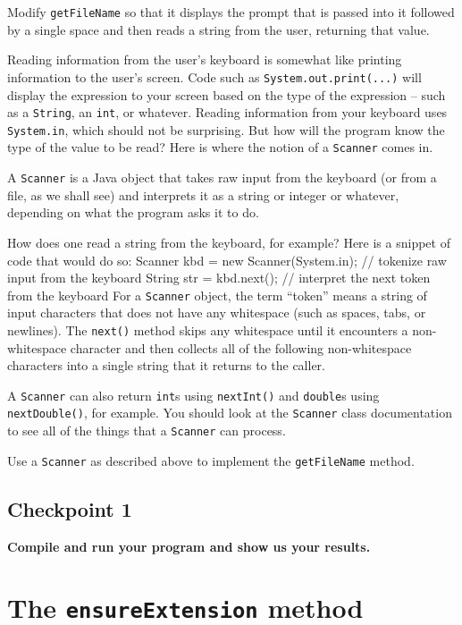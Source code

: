 \documentclass[12pt]{article}
\newenvironment{qv}%
  {\quote
   \verbatim}%
  {\endverbatim
   \endquote}
\newcommand{\code}{\texttt}
\begin{document}
Modify \code{getFileName} so that it displays the prompt
that is passed into it followed by a single space and then reads a
string from the user, returning that value.

Reading information from the user's keyboard
is somewhat like printing information to the user's screen.
Code such as \verb'System.out.print(...)' will display
the expression to your screen
based on the type of the expression --
such as a \verb'String', an \verb'int', or whatever.
Reading information from your keyboard uses \verb'System.in',
which should not be surprising.
But how will the program know the type of the value to be read?
Here is where the notion of a \verb'Scanner' comes in.

A \verb'Scanner' is a Java object that takes raw input
from the keyboard (or from a file, as we shall see)
and interprets it as a string or integer or whatever,
depending on what the program asks it to do.

How does one read a string from the keyboard, for example?
Here is a snippet of code that would do so:
\begin{qv}
Scanner kbd = new Scanner(System.in); // tokenize raw input from the keyboard
String str = kbd.next(); // interpret the next token from the keyboard
\end{qv}
For a \verb'Scanner' object, the term ``token'' means
a string of input characters that does not have any whitespace
(such as spaces, tabs, or newlines).
The \verb'next()' method skips any whitespace
until it encounters a non-whitespace character
and then collects all of the following non-whitespace characters
into a single string that it returns to the caller.

A \verb'Scanner' can also return \verb'int's using \verb'nextInt()'
and \verb'double's using \verb'nextDouble()', for example.
You should look at the \verb'Scanner' class documentation to see
all of the things that a \verb'Scanner' can process.

Use a \verb'Scanner' as described above
to implement the \verb'getFileName' method.

\subsection*{Checkpoint 1}
{\bf
Compile and run your program and show us your results.
}

\section*{The {\tt ensureExtension} method}
\end{document}
